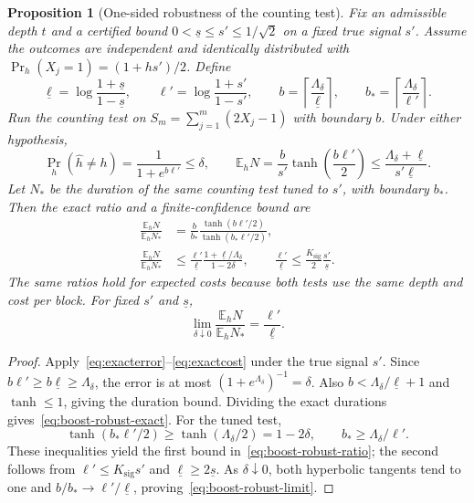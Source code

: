 \documentclass[11pt,a4paper]{article}
\newcommand{\E}{\mathbb E}
\newtheorem{proposition}[theorem]{Proposition}
\theoremstyle{definition}
\theoremstyle{remark}
\numberwithin{equation}{section}
\begin{document}
\begin{proposition}[One-sided robustness of the counting test]\label{prop:robust}
Fix an admissible depth $t$ and a certified bound
$0<\underline s\le s'\le1/\sqrt2$ on a fixed true signal $s'$.
Assume the outcomes are independent and identically distributed with
$\Pr_h(X_j=1)=(1+hs')/2$. Define
\begin{equation}\label{eq:boost-robust-boundaries}
\underline\ell=\log\frac{1+\underline s}{1-\underline s},\qquad
\ell'=\log\frac{1+s'}{1-s'},\qquad
b=\left\lceil\frac{\Lambda_\delta}{\underline\ell}\right\rceil,\qquad
b_*=\left\lceil\frac{\Lambda_\delta}{\ell'}\right\rceil.
\end{equation}
Run the counting test on $S_m=\sum_{j=1}^m(2X_j-1)$ with boundary $b$.
Under either hypothesis,
\begin{equation}\label{eq:robust}
\Pr_h(\widehat h\ne h)=\frac1{1+e^{b\ell'}}\le\delta,\qquad
\E_hN=\frac b{s'}\tanh\!\left(\frac{b\ell'}2\right)
\le\frac{\Lambda_\delta+\underline\ell}{s'\underline\ell}.
\end{equation}
Let $N_*$ be the duration of the same counting test tuned to $s'$, with
boundary $b_*$. Then the exact ratio and a finite-confidence bound are
\begin{align}
\frac{\E_hN}{\E_hN_*}
&=\frac b{b_*}
\frac{\tanh(b\ell'/2)}{\tanh(b_*\ell'/2)},
\label{eq:boost-robust-exact}\\
\frac{\E_hN}{\E_hN_*}
&\le\frac{\ell'}{\underline\ell}
\frac{1+\underline\ell/\Lambda_\delta}{1-2\delta},
\qquad
\frac{\ell'}{\underline\ell}
\le\frac{K_{\mathrm{sig}}}{2}\frac{s'}{\underline s}.
\label{eq:boost-robust-ratio}
\end{align}
The same ratios hold for expected costs because both tests use the same
depth and cost per block. For fixed $s'$ and $\underline s$,
\begin{equation}\label{eq:boost-robust-limit}
\lim_{\delta\downarrow 0}
\frac{\E_hN}{\E_hN_*}
=\frac{\ell'}{\underline\ell}.
\end{equation}
\end{proposition}
\begin{proof}
Apply~\eqref{eq:exacterror}--\eqref{eq:exactcost} under the true signal $s'$.
Since $b\ell'\ge b\underline\ell\ge \Lambda_\delta$, the error is at most
$(1+e^{\Lambda_\delta})^{-1}=\delta$. Also
$b<\Lambda_\delta/\underline\ell+1$ and $\tanh\le1$, giving the duration bound.
Dividing the exact durations gives~\eqref{eq:boost-robust-exact}.
For the tuned test,
\[
\tanh(b_*\ell'/2)\ge\tanh(\Lambda_\delta/2)=1-2\delta,
\qquad b_*\ge \Lambda_\delta/\ell'.
\]
These inequalities yield the first bound in~\eqref{eq:boost-robust-ratio};
the second follows from $\ell'\le K_{\mathrm{sig}}s'$ and
$\underline\ell\ge2\underline s$.
As $\delta\downarrow 0$, both hyperbolic tangents tend to one and
$b/b_*\to\ell'/\underline\ell$, proving~\eqref{eq:boost-robust-limit}.
\end{proof}
\end{document}
